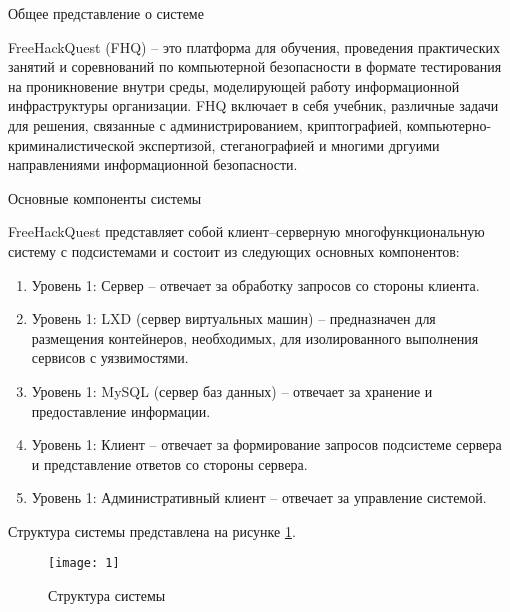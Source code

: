 \begin{center}
Общее представление о системе
\end{center}

\vspace{\baselineskip}

FreeHackQuest (FHQ) -- это платформа для обучения, проведения практических занятий и соревнований по компьютерной безопасности в формате тестирования на проникновение внутри среды, моделирующей работу информационной инфраструктуры организации. FHQ включает в себя учебник, различные задачи для решения, связанные с администрированием, криптографией, компьютерно-криминалистической экспертизой, стеганографией и многими дргуими направлениями информационной безопасности.\par

\begin{center}
Основные компоненты системы
\end{center}

\vspace{\baselineskip}

FreeHackQuest представляет собой клиент–серверную многофункциональную систему с подсистемами и состоит из следующих основных компонентов:
\begin{enumerate}
\item Уровень 1: Сервер -- отвечает за обработку запросов со стороны клиента.
\item Уровень 1: LXD (сервер виртуальных машин) -- предназначен для размещения контейнеров, необходимых, для изолированного выполнения сервисов с уязвимостями.
\item Уровень 1: MySQL (сервер баз данных) -- отвечает за хранение и предоставление информации.
\item Уровень 1: Клиент -- отвечает за формирование запросов подсистеме сервера и представление ответов со стороны сервера.
\item Уровень 1: Административный клиент -- отвечает за управление системой.
\end{enumerate}

\vspace{\baselineskip}

Структура системы представлена на рисунке \ref{img:1}.

\begin{figure}[h!]
        \centering
        \texttt{[image: 1]}
        \caption{Структура системы}
        \label{img:1}
\end{figure}
